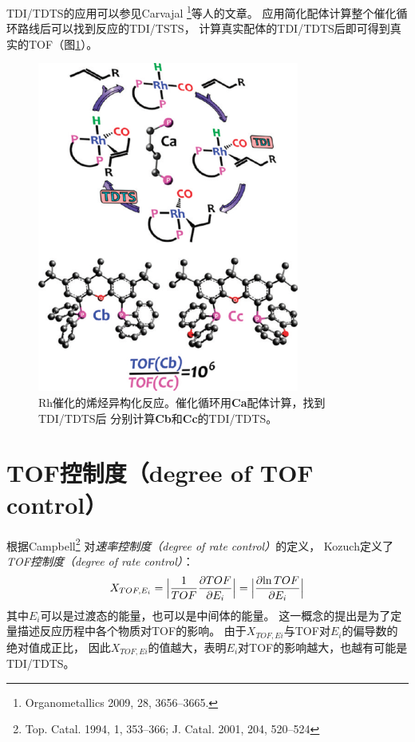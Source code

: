 \documentclass[a4paper,titlepage]{article}
\newcommand{\bigabs}[1]{\Bigl \lvert #1 \Bigr \rvert}
\begin{document}
TDI/TDTS的应用可以参见Carvajal
\footnote{Organometallics 2009, 28, 3656–3665.}等人的文章。
应用简化配体计算整个催化循环路线后可以找到反应的TDI/TSTS，
计算真实配体的TDI/TDTS后即可得到真实的TOF（图\ref{fig:tdi/tdts_utility}）。

\begin{figure}[H]
  \centering
  \includegraphics[scale=0.5]{fig3}
  \caption{Rh催化的烯烃异构化反应。催化循环用\textbf{Ca}配体计算，找到TDI/TDTS后
  分别计算\textbf{Cb}和\textbf{Cc}的TDI/TDTS。}
  \label{fig:tdi/tdts_utility}
\end{figure}

\section*{TOF控制度（degree of TOF control）}
根据Campbell\footnote{Top. Catal. 1994, 1, 353–366;  J. Catal. 2001, 204, 520–524}
对\textit{速率控制度（degree of rate control）}的定义，
Kozuch定义了\textit{TOF控制度（degree of rate control）}：
\begin{equation}\label{eq:TOF_control_def}
  X_{TOF,E_i} =
  \bigabs
  {
  \frac{1}{TOF}\frac{\partial{TOF}}{\partial{E_i}}
  } =
  \bigabs
  {
  \frac{\partial{\ln{TOF}}}{\partial{E_i}}
  }
\end{equation}
其中$E_i$可以是过渡态的能量，也可以是中间体的能量。
这一概念的提出是为了定量描述反应历程中各个物质对TOF的影响。
由于$X_{TOF,Ei}$与TOF对$E_i$的偏导数的绝对值成正比，
因此$X_{TOF,Ei}$的值越大，表明$E_i$对TOF的影响越大，也越有可能是TDI/TDTS。
\end{document}
